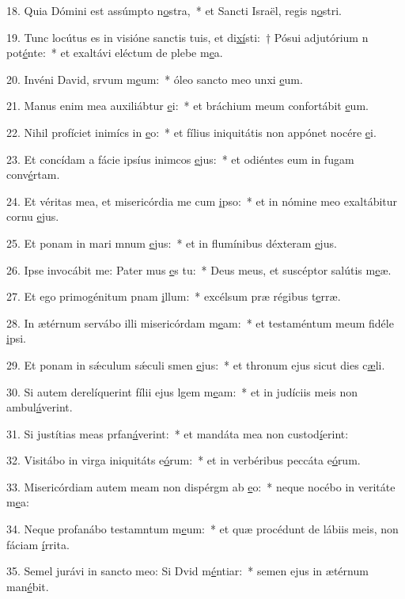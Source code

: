 18. Quia Dómini est assúmpto n\uline{o}stra,~* et Sancti Israël, regis n\uline{o}stri.\par 
19. Tunc locútus es in visióne sanctis tuis, et di\uline{xí}sti:~† Pósui adjutórium n pot\uline{é}nte:~* et exaltávi eléctum de plebe m\uline{e}a.\par 
20. Invéni David, srvum m\uline{e}um:~* óleo sancto meo unxi \uline{e}um.\par 
21. Manus enim mea auxiliábtur \uline{e}i:~* et bráchium meum confortábit \uline{e}um.\par 
22. Nihil profíciet inimícs in \uline{e}o:~* et fílius iniquitátis non appónet nocére \uline{e}i.\par 
23. Et concídam a fácie ipsíus inimcos \uline{e}jus:~* et odiéntes eum in fugam conv\uline{é}rtam.\par 
24. Et véritas mea, et misericórdia me cum \uline{i}pso:~* et in nómine meo exaltábitur cornu \uline{e}jus.\par 
25. Et ponam in mari mnum \uline{e}jus:~* et in flumínibus déxteram \uline{e}jus.\par 
26. Ipse invocábit me: Pater mus \uline{e}s tu:~* Deus meus, et suscéptor salútis m\uline{e}æ.\par 
27. Et ego primogénitum pnam \uline{i}llum:~* excélsum præ régibus t\uline{e}rræ.\par 
28. In ætérnum servábo illi misericórdam m\uline{e}am:~* et testaméntum meum fidéle \uline{i}psi.\par 
29. Et ponam in sǽculum sǽculi smen \uline{e}jus:~* et thronum ejus sicut dies c\uline{æ}li.\par 
30. Si autem derelíquerint fílii ejus lgem m\uline{e}am:~* et in judíciis meis non ambul\uline{á}verint.\par 
31. Si justítias meas prfan\uline{á}verint:~* et mandáta mea non custod\uline{í}erint:\par 
32. Visitábo in virga iniquitáts e\uline{ó}rum:~* et in verbéribus peccáta e\uline{ó}rum.\par 
33. Misericórdiam autem meam non dispérgm ab \uline{e}o:~* neque nocébo in veritáte m\uline{e}a:\par 
34. Neque profanábo testamntum m\uline{e}um:~* et quæ procédunt de lábiis meis, non fáciam \uline{í}rrita.\par 
35. Semel jurávi in sancto meo: Si Dvid m\uline{é}ntiar:~* semen ejus in ætérnum man\uline{é}bit.\par 
